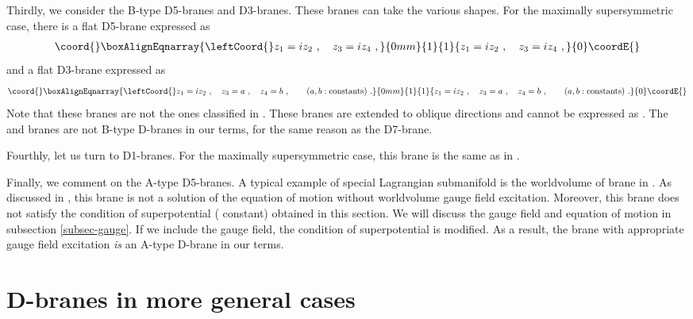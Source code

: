 \documentclass[a4paper,12pt]{article}
\numberwithin{equation}{section}
\DeclareMathOperator*{\im}{{\rm Im}}
\begin{document}
Thirdly, we consider the B-type D5-branes and D3-branes. These branes can
take the various shapes. For the maximally supersymmetric case,
there is a flat D5-brane expressed as
\begin{align}\coord{}\boxAlignEqnarray{
\leftCoord{}z_1=i z_2 ~,\quad z_3=i z_4 ~,
}{0mm}{1}{1}{
z_1=i z_2 ~,\quad z_3=i z_4 ~,
}{0}\coordE{}\end{align}
and a flat D3-brane expressed as
\begin{align}\coord{}\boxAlignEqnarray{
\leftCoord{}z_1=i z_2 ~,\quad z_3=a ~,\quad  z_4=b ~, \qquad(a,b:\text{constants})~.
}{0mm}{1}{1}{
z_1=i z_2 ~,\quad z_3=a ~,\quad  z_4=b ~, \qquad(a,b:\text{constants})~.
}{0}\coordE{}\end{align}
Note that these branes are not the ones classified in \cite{Skenderis:2002vf}.
These branes are extended to oblique directions and cannot be expressed as
\coordHE{}. The \coordHE{} and \coordHE{} branes are not B-type D-branes
in our terms, for the same reason as the \coordHE{} D7-brane.

Fourthly, let us turn to D1-branes. For the maximally supersymmetric case,
this brane is the same as \coordHE{} in \cite{Skenderis:2002vf}.

Finally, we comment on the A-type D5-branes. A typical example of
special Lagrangian submanifold 
is the worldvolume of \coordHE{} brane in \cite{Skenderis:2002vf}.
As discussed in \cite{Skenderis:2002vf}, this brane is not a solution of
the equation of motion without worldvolume gauge field excitation.
Moreover, this brane does not satisfy the condition
of superpotential (\myHighlight{$\im W=$}\coordHE{} constant) obtained in this section. 
We will discuss the gauge field
and equation of motion in subsection \ref{subsec-gauge}. If we include
the gauge field, the condition of superpotential is modified.
As a result, the \coordHE{} brane with appropriate gauge field
excitation {\em is} an A-type D-brane in our terms.


\section{D-branes in more general cases}
\label{section-general-backgrounds}
\end{document}
